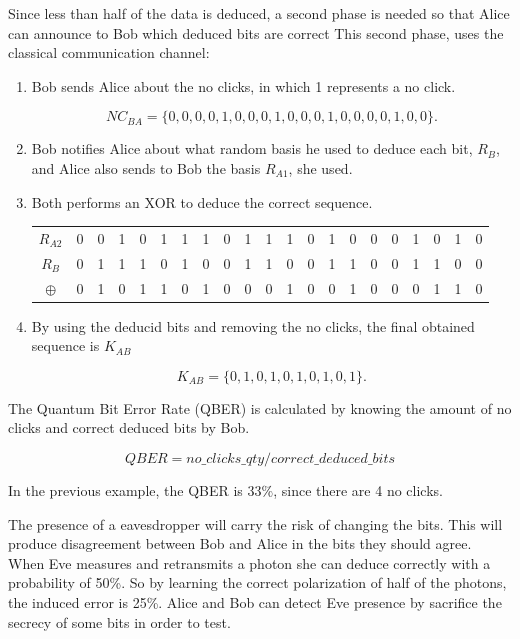 Since less than half of the data is deduced, a second phase is needed so that Alice can announce to Bob which deduced bits are correct This second phase, uses the classical communication channel:
\begin{enumerate}
	
	\item Bob sends Alice about the no clicks, in which 1 represents a no click.
	
	$$NC_{BA} = \{ 0,0,0,0,1,0,0,0,1,0,0,0,1,0,0,0,0,1,0,0\}.$$
	
	\item Bob notifies Alice about what random basis he used to deduce each bit, $R_{B}$, and Alice also sends to Bob the basis $R_{A1}$, she used.
	
	\item Both performs an XOR to deduce the correct sequence.
	
	\begin{table}[H]
		\centering
		\begin{tabular}{c|c c c c c c c c c c c c c c c c c c c c}
			$R_{A2}$ & 0 & 0 & 1 & 0 & 1 & 1 & 1 & 0 & 1 & 1 & 1 & 0 & 1 & 0 & 0 & 0 & 1 & 0 & 1 & 0 \\
			$R_{B}$  & 0 & 1 & 1 & 1 & 0 & 1 & 0 & 0 & 1 & 1 & 0 & 0 & 1 & 1 & 0 & 0 & 1 & 1 & 0 & 0 \\ \hline
			$\oplus$ & 0 & 1 & 0 & 1 & 1 & 0 & 1 & 0 & 0 & 0 & 1 & 0 & 0 & 1 & 0 & 0 & 0 & 1 & 1 & 0 \\
		\end{tabular}
	\end{table}
	
	\item By using the deducid bits and removing the no clicks, the final obtained sequence is $K_{AB}$
	
  	$$ K_{AB} = \{0,1,0,1,0,1,0,1,0,1\}.$$
		
\end{enumerate}

	The Quantum Bit Error Rate (QBER) is calculated by knowing the amount of no clicks and correct deduced bits by Bob.
	
	$$ QBER = no\_clicks\_qty / correct\_deduced\_bits $$
	
	In the previous example, the QBER is 33$\%$, since there are 4 no clicks.	

The presence of a eavesdropper will carry the risk of changing the bits. This will produce disagreement between Bob and Alice in the bits they should agree. When Eve measures and retransmits a photon she can deduce correctly with a probability of 50\%. So by learning the correct polarization of half of the photons, the induced error is 25\%. Alice and Bob can detect Eve presence by sacrifice the secrecy of some bits in order to test.

